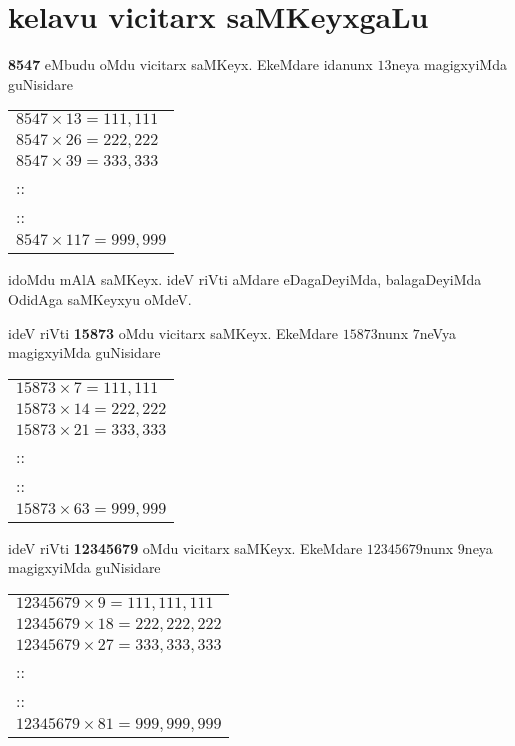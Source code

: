 \chapter{kelavu vicitarx saMKeyxgaLu}\label{chap11}

\begin{multicols}{2}
\noindent
{\rm\bfseries 8547} eMbudu oMdu vicitarx saMKeyx. EkeMdare idanunx $13$neya magigxyiMda guNi\-sidare
\begin{center}
\begin{tabular}{l}
$8547\times 13=111,111$\\[2pt]
$8547\times 26=222,222$\\[2pt]
$8547\times 39=333,333$\\[2pt]
::\\
::\\
{\small $8547\times 117=999,999$}
\end{tabular}
\end{center}

idoMdu mAlA saMKeyx. ideV riVti aMdare eDagaDeyiMda, balagaDe\-yiMda OdidAga saMKeyxyu oMdeV.

ideV riVti {\rm\bfseries 15873} oMdu \hbox{vicitarx} saMKeyx. EkeMdare $15873$nunx $7$neVya magigxyiMda guNisidare
\begin{center}
\begin{tabular}{l}
$15873\times 7=111,111$\\[2pt]
$15873\times 14=222,222$\\[2pt]
$15873\times 21=333,333$\\[2pt]
::\\
::\\
{\small $15873\times 63=999,999$}
\end{tabular}
\end{center}

ideV riVti {\rm\bfseries 12345679} oMdu \hbox{vicitarx} saMKeyx. EkeMdare $12345679$nunx $9$neya magigxyiMda guNisidare
\begin{center}
\begin{tabular}{l}
$12345679\times 9=111,111,111$\\[2pt]
$12345679\times 18=222,222,222$\\[2pt]
$12345679\times 27=333,333,333$\\[2pt]
::\\
::\\
{\small $12345679\times 81=999,999,999$}
\end{tabular}
\end{center}


\end{multicols}
